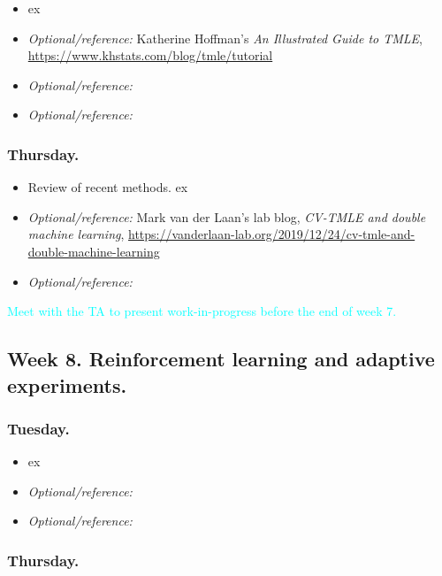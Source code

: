 \documentclass[letterpaper, 12pt, parskip=full,DIV=10]{scrartcl}
\begin{document}
\begin{itemize}
\item {}  ex
\item   \textit{Optional/reference:} Katherine Hoffman's \emph{An Illustrated Guide to TMLE}, \url{https://www.khstats.com/blog/tmle/tutorial}
\item  \textit{Optional/reference:}  
\item  \textit{Optional/reference:}  
\end{itemize}

\subsubsection*{Thursday.}

\begin{itemize}
\item Review of recent methods.   ex
\item   \textit{Optional/reference:} Mark van der Laan's lab blog, \emph{CV-TMLE and double machine learning}, \url{https://vanderlaan-lab.org/2019/12/24/cv-tmle-and-double-machine-learning}
\item \textit{Optional/reference:}  
\end{itemize}

\textcolor{cyan}{Meet with the TA to present work-in-progress before the end of week 7.}

\subsection*{Week 8. Reinforcement learning and adaptive experiments.}

\subsubsection*{Tuesday.}
\begin{itemize}
\item {}  ex
\item  \textit{Optional/reference:}  
\item  \textit{Optional/reference:}  
\end{itemize}

\subsubsection*{Thursday.}
\end{document}
